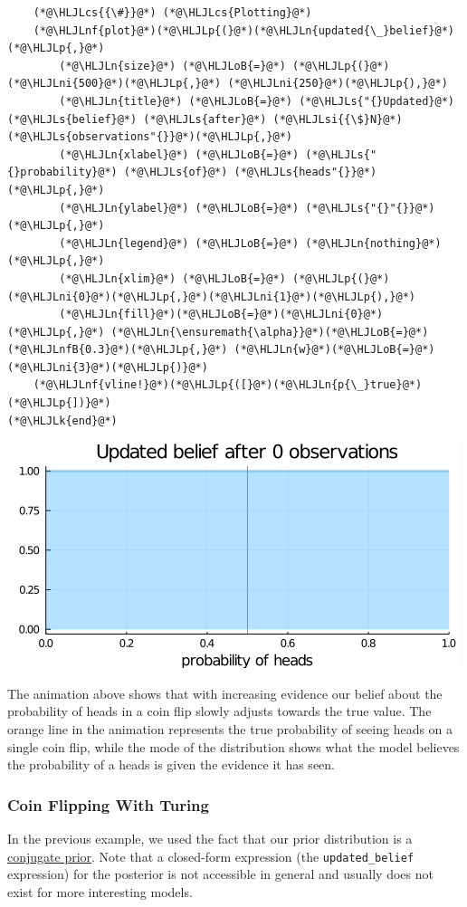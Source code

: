 \documentclass[12pt,a4paper]{article}
\newcommand{\HLJLk}[1]{\textcolor[RGB]{148,91,176}{\textbf{#1}}}
\newcommand{\HLJLn}[1]{#1}
\newcommand{\HLJLnf}[1]{\textcolor[RGB]{66,102,213}{#1}}
\newcommand{\HLJLs}[1]{\textcolor[RGB]{201,61,57}{#1}}
\newcommand{\HLJLsi}[1]{#1}
\newcommand{\HLJLnfB}[1]{\textcolor[RGB]{59,151,46}{#1}}
\newcommand{\HLJLni}[1]{\textcolor[RGB]{59,151,46}{#1}}
\newcommand{\HLJLoB}[1]{\textcolor[RGB]{102,102,102}{\textbf{#1}}}
\newcommand{\HLJLp}[1]{#1}
\newcommand{\HLJLcs}[1]{\textcolor[RGB]{153,153,119}{\textit{#1}}}
\begin{document}
\begin{lstlisting}
    (*@\HLJLcs{{\#}}@*) (*@\HLJLcs{Plotting}@*)
    (*@\HLJLnf{plot}@*)(*@\HLJLp{(}@*)(*@\HLJLn{updated{\_}belief}@*)(*@\HLJLp{,}@*) 
        (*@\HLJLn{size}@*) (*@\HLJLoB{=}@*) (*@\HLJLp{(}@*)(*@\HLJLni{500}@*)(*@\HLJLp{,}@*) (*@\HLJLni{250}@*)(*@\HLJLp{),}@*) 
        (*@\HLJLn{title}@*) (*@\HLJLoB{=}@*) (*@\HLJLs{"{}Updated}@*) (*@\HLJLs{belief}@*) (*@\HLJLs{after}@*) (*@\HLJLsi{{\$}N}@*) (*@\HLJLs{observations"{}}@*)(*@\HLJLp{,}@*)
        (*@\HLJLn{xlabel}@*) (*@\HLJLoB{=}@*) (*@\HLJLs{"{}probability}@*) (*@\HLJLs{of}@*) (*@\HLJLs{heads"{}}@*)(*@\HLJLp{,}@*) 
        (*@\HLJLn{ylabel}@*) (*@\HLJLoB{=}@*) (*@\HLJLs{"{}"{}}@*)(*@\HLJLp{,}@*) 
        (*@\HLJLn{legend}@*) (*@\HLJLoB{=}@*) (*@\HLJLn{nothing}@*)(*@\HLJLp{,}@*)
        (*@\HLJLn{xlim}@*) (*@\HLJLoB{=}@*) (*@\HLJLp{(}@*)(*@\HLJLni{0}@*)(*@\HLJLp{,}@*)(*@\HLJLni{1}@*)(*@\HLJLp{),}@*)
        (*@\HLJLn{fill}@*)(*@\HLJLoB{=}@*)(*@\HLJLni{0}@*)(*@\HLJLp{,}@*) (*@\HLJLn{\ensuremath{\alpha}}@*)(*@\HLJLoB{=}@*)(*@\HLJLnfB{0.3}@*)(*@\HLJLp{,}@*) (*@\HLJLn{w}@*)(*@\HLJLoB{=}@*)(*@\HLJLni{3}@*)(*@\HLJLp{)}@*)
    (*@\HLJLnf{vline!}@*)(*@\HLJLp{([}@*)(*@\HLJLn{p{\_}true}@*)(*@\HLJLp{])}@*)
(*@\HLJLk{end}@*)
\end{lstlisting}

\includegraphics[width=\linewidth]{jl_USrzxA/00_introduction_5_1.gif}

The animation above shows that with increasing evidence our belief about the probability of heads in a coin flip slowly adjusts towards the true value. The orange line in the animation represents the true probability of seeing heads on a single coin flip, while the mode of the distribution shows what the model believes the probability of a heads is given the evidence it has seen.

\subsubsection{Coin Flipping With Turing}
In the previous example, we used the fact that our prior distribution is a \href{https://en.wikipedia.org/wiki/Conjugate_prior}{conjugate prior}. Note that a closed-form expression (the \texttt{updated\_belief} expression) for the posterior is not accessible in general and usually does not exist for more interesting models. 
\end{document}
